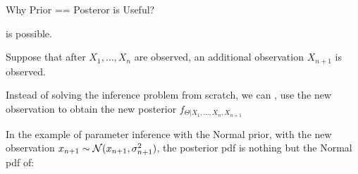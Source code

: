 \begin{frame}{Why Prior == Posteror is Useful?}


  \plitemsep 0.07in
  \bci
  
\item<2->  is possible.
  
\item<3-> Suppose that after $X_1, \ldots, X_n$ are observed, an
  additional observation $X_{n+1}$ is observed.

\item<4-> Instead of solving the inference problem from scratch, we can
  , use the new
  observation to obtain the new posterior  $f_{\Theta | X_1, \ldots, X_n,X_{n+1}}$

\item<5-> In the example of parameter inference with the Normal prior,
  with the new observation $x_{n+1} \sim \mathcal N(x_{n+1},
  \sigma^2_{n+1})$, the posterior pdf is nothing but the Normal pdf of:
  \aleq
  {
  }
  \eci

\end{frame}



